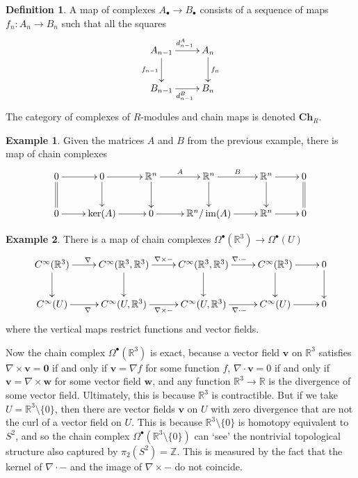 \documentclass{tufte-handout}
\def\Ch{\mathbf{Ch}}
\def\RR{\mathbb{R}}
\def\ZZ{\mathbb{Z}}
\DeclareMathOperator{\im}{im}
\theoremstyle{definition}
\newtheorem{definition}{Definition}
\newtheorem{example}{Example}
\begin{document}
\begin{definition}
A map of complexes $A_\bullet \to 
B_\bullet$ consists of a sequence of maps $f_n\colon A_n \to B_n$ such that all the 
squares
\[
	\xymatrix{
		A_{n-1} \ar[r]^{d_{n-1}^A} \ar[d]_{f_{n-1}} & A_n \ar[d]^{f_n}\\
		B_{n-1} \ar[r]_{d_{n-1}^B} & B_n
	}
\]
The category of complexes of $R$-modules and chain maps is denoted $\Ch_R$.
\end{definition}

\begin{example}
Given the matrices $A$ and $B$ from the previous example, there is map of chain complexes
\[
	\xymatrix{
		0 \ar[r] \ar@{=}[d] & 0 \ar[r] \ar[d] & \RR^n \ar[r]^A \ar[d] & \RR^n \ar[r]^B \ar[d] & \RR^n \ar[r] \ar[d] & 0 \ar@{=}[d]\\
		0 \ar[r] & \ker(A) \ar[r] & 0 \ar[r] & \RR^n/\im(A) \ar[r] & \RR^n \ar[r] & 0
	}
\]
\end{example}

\begin{example}
There is a map of chain complexes $\Omega^\bullet(\RR^3) \to \Omega^\bullet(U)$
\[
	\xymatrix{
	C^\infty(\RR^3) \ar[d] \ar[r]^{\nabla} & C^\infty(\RR^3,\RR^3) \ar[d] \ar[r]^{\nabla\times -} & C^\infty(\RR^3,\RR^3) \ar[d] \ar[r]^{\nabla\cdot -} & C^\infty(\RR^3) \ar[d] \ar[r] & 0 \ar[d] \\
	C^\infty(U) \ar[r]_{\nabla} & C^\infty(U,\RR^3) \ar[r]_{\nabla\times -} & C^\infty(U,\RR^3) \ar[r]_{\nabla\cdot -} & C^\infty(U)\ar[r] & 0
	}
\]
where the vertical maps restrict functions and vector fields.
\end{example}

Now the chain complex $\Omega^\bullet(\RR^3)$ is exact, because a vector field 
$\mathbf{v}$ on $\RR^3$ satisfies $\nabla\times \mathbf{v}=\mathbf{0}$ if and only if 
$\mathbf{v} = \nabla f$ for some function $f$, $\nabla\cdot \mathbf{v} = 0$ if and only 
if $\mathbf{v} = \nabla\times \mathbf{w}$ for some vector field $\mathbf{w}$, and any 
function $\RR^3\to \RR$ is the divergence of some vector field. Ultimately, this is 
because $\RR^3$ is contractible. But if we take $U = \RR^3\setminus\{0\}$, then there 
are vector fields $\mathbf{v}$ on $U$ with zero divergence that are not the curl of a 
vector field on $U$. This is because $\RR^3\setminus\{0\}$ is homotopy equivalent to 
$S^2$, and so the chain complex $\Omega^\bullet(\RR^3\setminus\{0\})$ can `see' the 
nontrivial topological structure also captured by $\pi_2(S^2) = \ZZ$. This is measured 
by the fact that the kernel of $\nabla\cdot -$ and the image of $\nabla\times -$ do not 
coincide.
\end{document}
